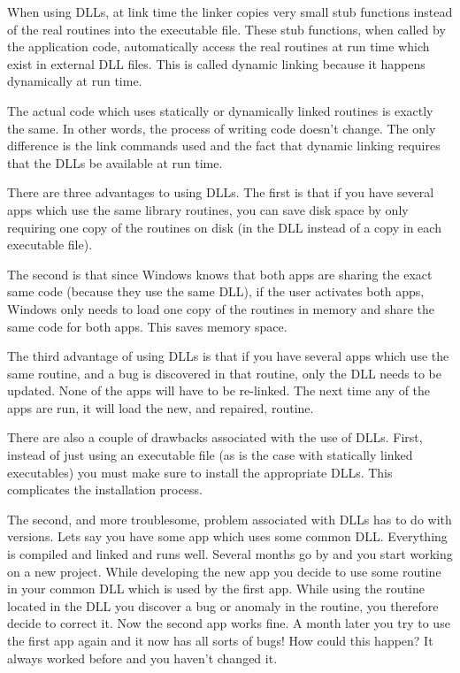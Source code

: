 When using DLLs, at link time the linker copies very small stub
functions instead of the real routines into the executable file.  These
stub functions, when called by the application code, automatically
access the real routines at run time which exist in external DLL files.
This is called dynamic linking because it happens dynamically at run time.

The actual code which uses statically or dynamically linked routines is
exactly the same.  In other words, the process of writing code doesn't
change.  The only difference is the link commands used and the fact that
dynamic linking requires that the DLLs be available at run time.

There are three advantages to using DLLs.  The first is that if you have
several apps which use the same library routines, you can save disk
space by only requiring one copy of the routines on disk (in the DLL
instead of a copy in each executable file).

The second is that since Windows knows that both apps are sharing the
exact same code (because they use the same DLL), if the user activates
both apps, Windows only needs to load one copy of the routines in memory
and share the same code for both apps.  This saves memory space.

The third advantage of using DLLs is that if you have several apps which
use the same routine, and a bug is discovered in that routine, only the
DLL needs to be updated.  None of the apps will have to be re-linked.
The next time any of the apps are run, it will load the new, and repaired,
routine.

There are also a couple of drawbacks associated with the use of DLLs.
First, instead of just using an executable file (as is the case with
statically linked executables) you must make sure to install the appropriate
DLLs.  This complicates the installation process.

The second, and more troublesome, problem associated with DLLs has to do
with versions.  Lets say you have some app which uses some common DLL.
Everything is compiled and linked and runs well.  Several months go by
and you start working on a new project.  While developing the new app
you decide to use some routine in your common DLL which is used by the
first app.  While using the routine located in the DLL you discover a
bug or anomaly in the routine, you therefore decide to correct it.
Now the second app works fine.  A month later you try to use the first
app again and it now has all sorts of bugs!  How could this happen?
It always worked before and you haven't changed it.

